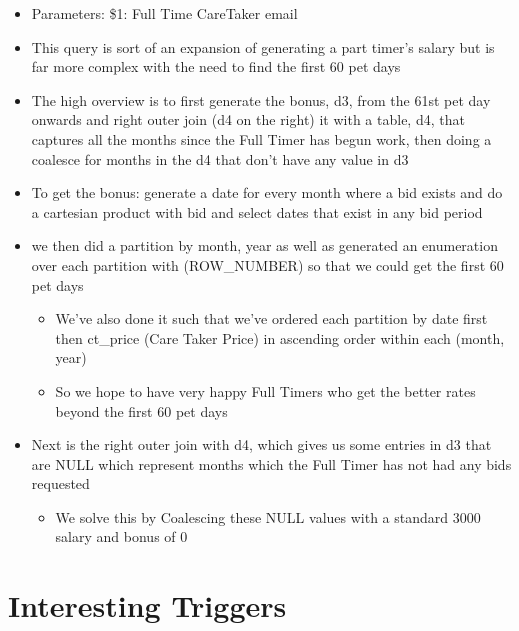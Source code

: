 \documentclass[
  paper=a4,
  ,captions=tableheading
]{scrartcl}
\providecommand{\tightlist}{%
  \setlength{\itemsep}{0pt}\setlength{\parskip}{0pt}}
\begin{document}
\begin{itemize}
\tightlist
\item
  Parameters: \$1: Full Time CareTaker email
\item
  This query is sort of an expansion of generating a part timer's salary
  but is far more complex with the need to find the first 60 pet days
\item
  The high overview is to first generate the bonus, d3, from the 61st
  pet day onwards and right outer join (d4 on the right) it with a
  table, d4, that captures all the months since the Full Timer has begun
  work, then doing a coalesce for months in the d4 that don't have any
  value in d3
\item
  To get the bonus: generate a date for every month where a bid exists
  and do a cartesian product with bid and select dates that exist in any
  bid period
\item
  we then did a partition by month, year as well as generated an
  enumeration over each partition with (ROW\_NUMBER) so that we could
  get the first 60 pet days

  \begin{itemize}
  \tightlist
  \item
    We've also done it such that we've ordered each partition by date
    first then ct\_price (Care Taker Price) in ascending order within
    each (month, year)
  \item
    So we hope to have very happy Full Timers who get the better rates
    beyond the first 60 pet days
  \end{itemize}
\item
  Next is the right outer join with d4, which gives us some entries in
  d3 that are NULL which represent months which the Full Timer has not
  had any bids requested

  \begin{itemize}
  \tightlist
  \item
    We solve this by Coalescing these NULL values with a standard 3000
    salary and bonus of 0
  \end{itemize}
\end{itemize}

\hypertarget{interesting-triggers}{%
\section{Interesting Triggers}\label{interesting-triggers}}
\end{document}
